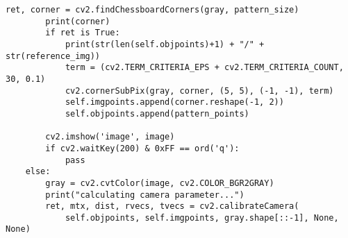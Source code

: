 \begin{lstlisting}[caption=calibration code,label=calib_code]
        ret, corner = cv2.findChessboardCorners(gray, pattern_size)                                                                                          
        print(corner)                                                                                                                                        
        if ret is True:                                                                                                                                      
            print(str(len(self.objpoints)+1) + "/" + str(reference_img))                                                                                     
            term = (cv2.TERM_CRITERIA_EPS + cv2.TERM_CRITERIA_COUNT, 30, 0.1)                                                                                
            cv2.cornerSubPix(gray, corner, (5, 5), (-1, -1), term)                                                                                           
            self.imgpoints.append(corner.reshape(-1, 2))                                                                                                     
            self.objpoints.append(pattern_points)                                                                                                            
                                                                                                                                                            
        cv2.imshow('image', image)                                                                                                                           
        if cv2.waitKey(200) & 0xFF == ord('q'):                                                                                                              
            pass                                                                                                                                             
    else:                                                                                                                                                    
        gray = cv2.cvtColor(image, cv2.COLOR_BGR2GRAY)                                                                                                       
        print("calculating camera parameter...")                                                                                                             
        ret, mtx, dist, rvecs, tvecs = cv2.calibrateCamera(                                                                                                  
            self.objpoints, self.imgpoints, gray.shape[::-1], None, None)                                                                                    
                                                                                                                                                            

\end{lstlisting}
